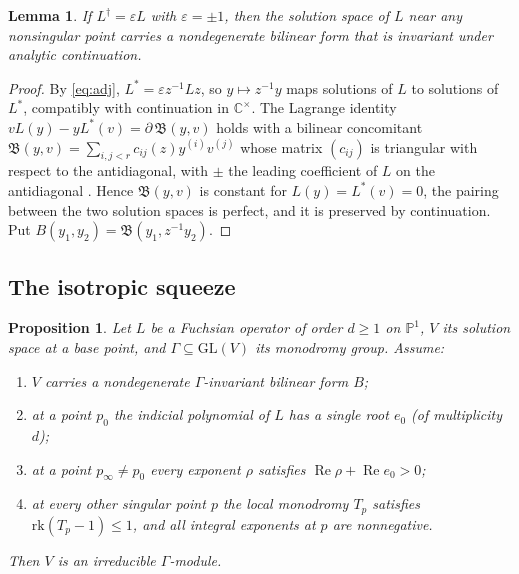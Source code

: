 \documentclass[11pt]{amsart}
\newtheorem{proposition}[thm]{Proposition}
\newtheorem{lemma}[thm]{Lemma}
\theoremstyle{definition}
\newcommand{\C}{\mathbb C}
\newcommand{\PP}{\mathbb P}
\newcommand{\GL}{\mathrm{GL}}
\newcommand{\rk}{\mathrm{rk}}
\begin{document}
\begin{lemma}\label{lem:form}
If $L^\dagger=\varepsilon L$ with $\varepsilon=\pm1$, then the solution space of $L$ near any nonsingular point carries a nondegenerate bilinear form that is invariant under analytic continuation.
\end{lemma}

\begin{proof}
By \eqref{eq:adj}, $L^*=\varepsilon z^{-1}Lz$, so $y\mapsto z^{-1}y$ maps solutions of $L$ to solutions of $L^*$, compatibly with continuation in $\C^\times$. The Lagrange identity $vL(y)-yL^*(v)=\partial\,\mathfrak B(y,v)$ holds with a bilinear concomitant $\mathfrak B(y,v)=\sum_{i,j<r}c_{ij}(z)y^{(i)}v^{(j)}$ whose matrix $(c_{ij})$ is triangular with respect to the antidiagonal, with $\pm$ the leading coefficient of $L$ on the antidiagonal \cite{Inc56}. Hence $\mathfrak B(y,v)$ is constant for $L(y)=L^*(v)=0$, the pairing between the two solution spaces is perfect, and it is preserved by continuation. Put $B(y_1,y_2)=\mathfrak B(y_1,z^{-1}y_2)$.
\end{proof}

\subsection{The isotropic squeeze}

\begin{proposition}\label{prop:squeeze}
Let $L$ be a Fuchsian operator of order $d\ge1$ on $\PP^1$, $V$ its solution space at a base point, and $\Gamma\subseteq\GL(V)$ its monodromy group. Assume:
\begin{enumerate}[label=\textup{(\alph*)}]
\item $V$ carries a nondegenerate $\Gamma$-invariant bilinear form $B$;
\item at a point $p_0$ the indicial polynomial of $L$ has a single root $e_0$ \textup{(}of multiplicity $d$\textup{)};
\item at a point $p_\infty\ne p_0$ every exponent $\rho$ satisfies $\operatorname{Re}\rho+\operatorname{Re}e_0>0$;
\item at every other singular point $p$ the local monodromy $T_p$ satisfies $\rk(T_p-1)\le1$, and all integral exponents at $p$ are nonnegative.
\end{enumerate}
Then $V$ is an irreducible $\Gamma$-module.
\end{proposition}
\end{document}
